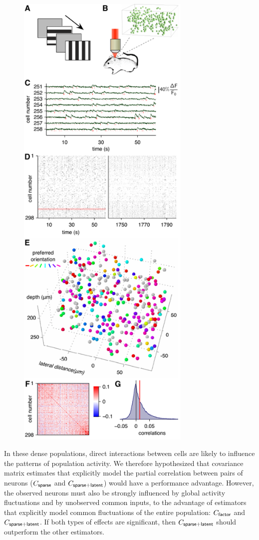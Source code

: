 \documentclass[10pt]{article}
\begin{document}
\begin{figure}
    {\includegraphics[width=8.3cm]{figures/Figure03.pdf}}
\end{figure}

In these dense populations, direct interactions between cells are likely to influence the patterns of population activity.  We therefore hypothesized that covariance matrix estimates that explicitly model the partial correlation between pairs of neurons ($C_{\sf sparse}$ and $C_{\sf sparse+latent}$) would have a performance advantage.  However, the observed neurons must also be strongly influenced by global activity fluctuations and by unobserved common inputs, to the advantage of estimators that explicitly model common fluctuations of the entire population: $C_{\sf factor}$ and $C_{\sf sparse+latent}$.  If both types of effects are significant, then $C_{\sf sparse+latent}$ should outperform the other estimators.
\end{document}
